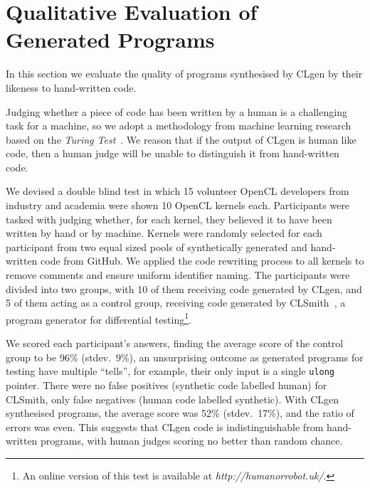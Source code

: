 \section{Qualitative Evaluation of Generated Programs}
\label{sec:clgen-qualitative-evaluation}

In this section we evaluate the quality of programs synthesised by CLgen by their likeness to hand-written code.


Judging whether a piece of code has been written by a human is a challenging task for a machine, so we adopt a methodology from machine learning research based on the \emph{Turing Test}~\cite{Gao2015a,Zhang2016,Vinyals}. We reason that if the output of CLgen is human like code, then a human judge will be unable to distinguish it from hand-written code.

We devised a double blind test in which 15 volunteer OpenCL developers from industry and academia were shown 10 OpenCL kernels each. Participants were tasked with judging whether, for each kernel, they believed it to have been written by hand or by machine. Kernels were randomly selected for each participant from two equal sized pools of synthetically generated and hand-written code from GitHub. We applied the code rewriting process to all kernels to remove comments and ensure uniform identifier naming. The participants were divided into two groups, with 10 of them receiving code generated by CLgen, and 5 of them acting as a control group, receiving code generated by CLSmith~\cite{Lidbury2015a}, a program generator for differential testing\footnote{An online version of this test is available at \emph{http://humanorrobot.uk/}.}.

We scored each participant's answers, finding the average score of the control group to be 96\% (stdev.\ 9\%), an unsurprising outcome as generated programs for testing have multiple ``tells'', for example, their only input is a single \texttt{ulong} pointer. There were no false positives (synthetic code labelled human) for CLSmith, only false negatives (human code labelled synthetic). With CLgen synthesised programs, the average score was 52\% (stdev.\ 17\%), and the ratio of errors was even. This suggests that CLgen code is indistinguishable from hand-written programs, with human judges scoring no better than random chance.
